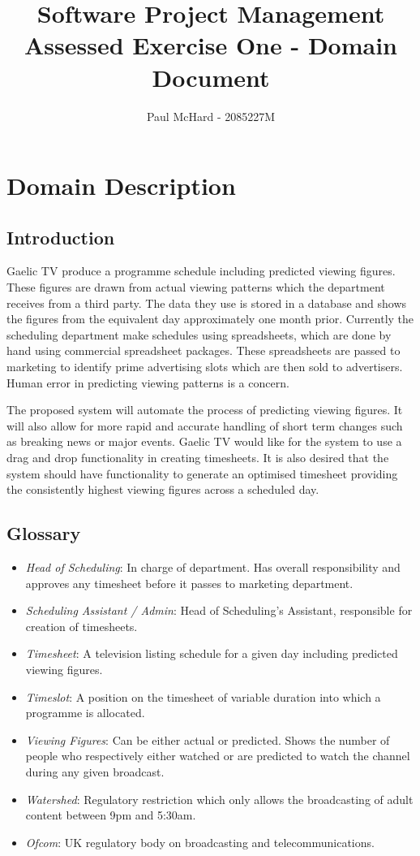 \documentclass[11pt, oneside]{article}
\title{Software Project Management Assessed Exercise One - Domain Document }
\author{Paul McHard - 2085227M}
\date{\displaydate{referencedate}}
\begin{document}
\maketitle
\tableofcontents
\section{Domain Description}
\subsection{Introduction}
Gaelic TV produce a programme schedule including predicted viewing figures. These figures are drawn from actual viewing patterns which the department receives from a third party. The data they use is stored in a database and shows the figures from the equivalent day approximately one month prior. Currently the scheduling department make schedules using spreadsheets, which are done by hand using commercial spreadsheet packages. These spreadsheets are passed to marketing to identify prime advertising slots which are then sold to advertisers. Human error in predicting viewing patterns is a concern.

The proposed system will automate the process of predicting viewing figures. It will also allow for more rapid and accurate handling of short term changes such as breaking news or major events. Gaelic TV would like for the system to use a drag and drop functionality in creating timesheets. It is also desired that the system should have functionality to generate an optimised timesheet providing the consistently highest viewing figures across a scheduled day.

\subsection{Glossary}
\begin{itemize}
\item \textit{Head of Scheduling}: In charge of department. Has overall responsibility and approves any timesheet before it passes to marketing department.
\item \textit{Scheduling Assistant / Admin}: Head of Scheduling's Assistant, responsible for creation of timesheets.
\item \textit{Timesheet}: A television listing schedule for a given day including predicted viewing figures.
\item \textit{Timeslot}: A position on the timesheet of variable duration into which a programme is allocated.
\item \textit{Viewing Figures}: Can be either actual or predicted. Shows the number of people who respectively either watched or are predicted to watch the channel during any given broadcast.
\item \textit{Watershed}: Regulatory restriction which only allows the broadcasting of adult content between 9pm and 5:30am.
\item \textit{Ofcom}: UK regulatory body on broadcasting and telecommunications. 
\end{itemize}
\end{document}
